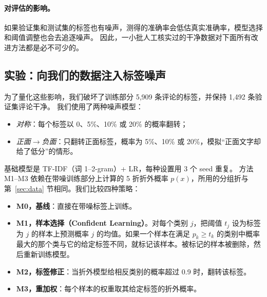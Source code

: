 \documentclass[11pt,a4paper]{article}
\begin{document}
\paragraph{对评估的影响。}
如果验证集和测试集的标签也有噪声，测得的准确率会低估真实准确率，模型选择和阈值调整也会去追逐噪声。
因此，一小批人工核实过的干净数据对下面所有改进方法都是必不可少的。

\subsection{实验：向我们的数据注入标签噪声}
为了量化这些影响，我们破坏了训练部分 5{,}909 条评论的标签，并保持 1{,}492 条验证集评论干净。
我们使用了两种噪声模型：
\begin{itemize}
  \item \emph{对称}：每个标签以 0、5\%、10\% 或 20\% 的概率翻转；
  \item \emph{正面$\to$负面}：只翻转正面标签，概率为 5\%、10\% 或 20\%，模拟``正面文字却给了低分''的情形。
\end{itemize}
基础模型是 TF-IDF（词 1--2-gram）+ LR，每种设置用 3 个 seed 重复。
方法 M1--M3 依赖在带噪训练部分上计算的 5 折折外概率 $p(x)$，所用的分组折与第~\ref{sec:data} 节相同。我们比较四种策略：
\begin{itemize}
  \item \textbf{M0，基线}：直接在带噪标签上训练。
  \item \textbf{M1，样本选择（Confident Learning）}\cite{northcutt2021confident}。对每个类别 $j$，把阈值 $t_j$ 设为标签为 $j$ 的样本上预测概率 $j$ 的均值。如果一个样本在满足 $p_k \ge t_k$ 的类别中概率最大的那个类与它的给定标签不同，就标记该样本。被标记的样本被删除，然后重新训练模型。
  \item \textbf{M2，标签修正}：当折外模型给相反类别的概率超过 0.9 时，翻转该标签。
  \item \textbf{M3，重加权}：每个样本的权重取其给定标签的折外概率。
\end{itemize}
\end{document}
